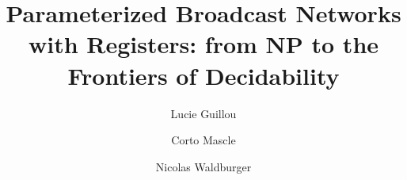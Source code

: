 \documentclass[runningheads]{llncs}
\begin{document}
\title{Parameterized Broadcast Networks with Registers: from NP to the Frontiers of Decidability}




\author{Lucie Guillou \and Corto Mascle \and Nicolas Waldburger}




	\maketitle
	


\newcommand{\cortoin}[1]{\todo[color=blue!20,inline]{\small #1}}
\newcommand{\corto}[1]{\todo[color=blue!20]{\small #1}}

\newcommand{\nicoin}[1]{\todo[color=red!20,inline]{\small #1}}
\newcommand{\nico}[1]{\todo[color=red!20]{\small #1}}

\newcommand{\luin}[1]{\todo[color=teal!20,inline]{\small #1}}
\newcommand{\lu}[1]{\todo[color=teal!20]{\small #1}}
\end{document}
